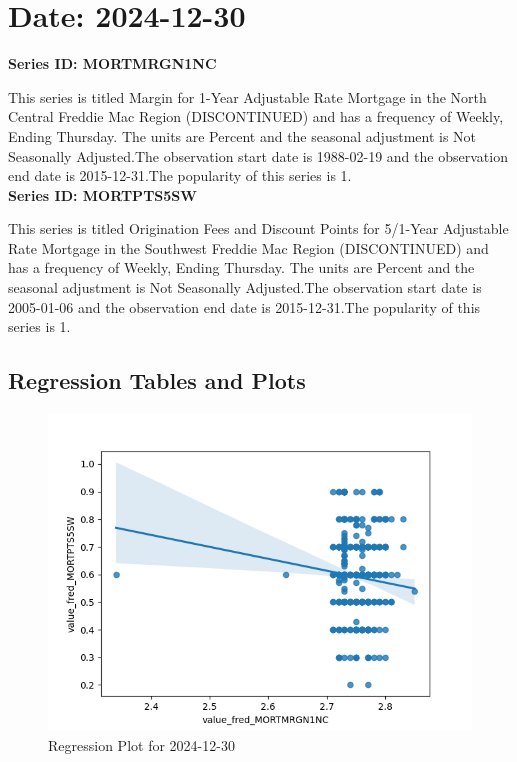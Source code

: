 \section{Date: 2024-12-30}
\noindent \textbf{Series ID: MORTMRGN1NC} 

\noindent This series is titled Margin for 1-Year Adjustable Rate Mortgage in the North Central Freddie Mac Region (DISCONTINUED) and has a frequency of Weekly, Ending Thursday. The units are Percent and the seasonal adjustment is Not Seasonally Adjusted.The observation start date is 1988-02-19 and the observation end date is 2015-12-31.The popularity of this series is 1. \\ 

\noindent \textbf{Series ID: MORTPTS5SW} 

\noindent This series is titled Origination Fees and Discount Points for 5/1-Year Adjustable Rate Mortgage in the Southwest Freddie Mac Region (DISCONTINUED) and has a frequency of Weekly, Ending Thursday. The units are Percent and the seasonal adjustment is Not Seasonally Adjusted.The observation start date is 2005-01-06 and the observation end date is 2015-12-31.The popularity of this series is 1. \\ 

\subsection{Regression Tables and Plots}


\begin{figure}
\centering
\includegraphics[scale = 0.9]{plots/plot_2024-12-30.png}
\caption{Regression Plot for 2024-12-30}
\end{figure}
\newpage
